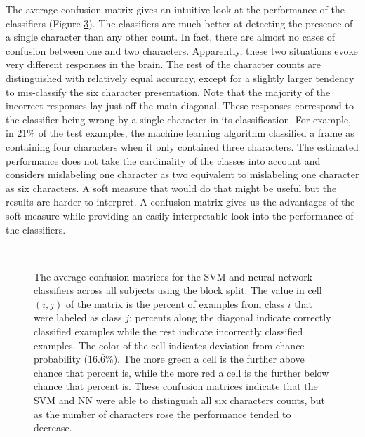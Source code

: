 \documentclass[5p,authoryear]{elsarticle}
\begin{document}
The average confusion matrix gives an intuitive look at the performance of the classifiers (Figure \ref{fig:average-confusion}).
The classifiers are much better at detecting the presence of a single character than any other count.
In fact, there are almost no cases of confusion between one and two characters.
Apparently, these two situations evoke very different responses in the brain.
The rest of the character counts are distinguished with relatively equal accuracy,
except for a slightly larger tendency to mis-classify the six character presentation.
Note that the majority of the incorrect responses lay just off the main diagonal.
These responses correspond to the classifier being wrong by a single character in its classification.
For example, in 21\% of the test examples, the machine learning algorithm classified a frame as containing four characters when it only contained three characters.
The estimated performance does not take the cardinality of the classes into account and considers mislabeling one character as two equivalent to mislabeling one character as six characters.
A soft measure that would do that might be useful but the results are harder to interpret.
A confusion matrix gives us the advantages of the soft measure while providing an easily interpretable look into the performance of the classifiers.

\begin{figure}
\centering
\begin{subfigure}{0.3\textwidth}
\centering
\begin{adjustbox}{center}

\end{adjustbox}
\caption{}
\label{fig:average-confusion-svm}
\end{subfigure}
\\
\begin{subfigure}{0.3\textwidth}
\centering
\begin{adjustbox}{center}

\end{adjustbox}
\caption{}
\label{fig:average-confusion-nn}
\end{subfigure}
\caption{The average confusion matrices for the  SVM and  neural network classifiers across all subjects using the block split.
The value in cell $(i,j)$ of the matrix is the percent of examples from class $i$ that were labeled as class $j$; percents along the diagonal indicate correctly classified examples while the rest indicate incorrectly classified examples.
The color of the cell indicates deviation from chance probability ($16.\overline{6}$\%).
The more green a cell is the further above chance that percent is, while the more red a cell is the further below chance that percent is.
These confusion matrices indicate that the SVM and NN were able to distinguish all six characters counts, but as the number of characters rose the performance tended to decrease.}
\label{fig:average-confusion}
\end{figure}
\end{document}

